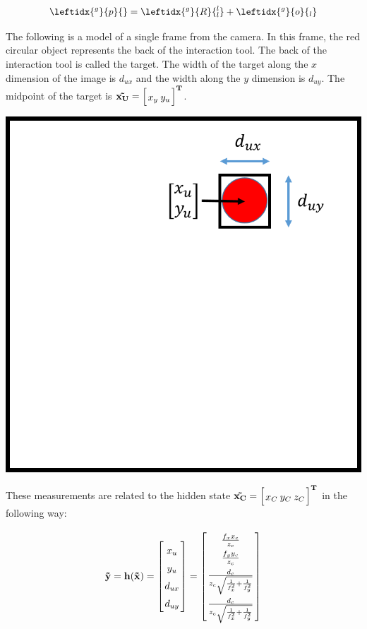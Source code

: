 \documentclass{article}
\newcommand{\mat}[2][ccccccccccccccccccccccccccccccccccccccccccccc]{\left[
        \arraycolsep=1.2pt\def\arraystretch{1.5}
        \begin{array}{#1} #2 \\ 
        \end{array} 
        \right]}
\begin{document}
\begin{flushleft}


\medskip

\[\leftidx{^g}{p}{} = \leftidx{^g}{R}{^l_l}+\leftidx{^g}{o}{_l}\]


\medskip

The following is a model of a single frame from the camera. In this frame,
the red circular object represents the back of the interaction tool. The back
of the interaction tool is called the target. The width of the target along
the $x$ dimension of the image is $d_{ux}$ and the width along the $y$ 
dimension is $d_{uy}$. The midpoint of the target is 
$\bf{\vec{x_U}} = \mat{ x_y & y_u }^{T}$.

\medskip

\begin{center}
    \includegraphics[scale=0.4]{cameraMeasurement}
\end{center}

\medskip

These measurements are related to the hidden state $\bf{\vec{x_C}} = 
\mat{ x_C & y_C & z_C }^{T}$ in the following way: 

\[
    \bf{\vec{y}} = h(\bf{\vec{x}})
         = \mat{x_u \\ y_u \\ d_{ux} \\ d_{uy}} 
     = \mat{ \frac{f_x x_c}{z_c} \\ 
             \frac{f_y y_c}{z_c} \\ 
             \frac{d_c}{z_c \sqrt{\frac{1}{f_x^{2}} + \frac{1}{f_y^{2}}}} \\
             \frac{d_c}{z_c \sqrt{\frac{1}{f_x^{2}} + \frac{1}{f_y^{2}}}}
           }
\]

\end{flushleft}
\end{document}
